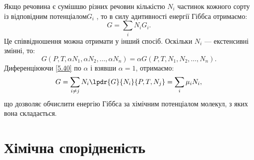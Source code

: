 Якщо речовина є сумішшю різних речовин кількістю $N_i$ частинок кожного сорту із відповідним потенціалом$ G_i$ , то в силу адитивності енергії Гіббса отримаємо:
\begin{equation}\label{5.39}
	G = \sum_{i}N_{i}G_{i}.
\end{equation}
Це співвідношення можна отримати у інший спосіб. Оскільки $N_{i}$ --- екстенсивні змінні, то:
\begin{equation}\label{5.40}
	G(P,T,\alpha N_{1}, \alpha N_{2}, \ldots, \alpha N_{n})= \alpha G(P,T,N_{1}, N_{2}, \ldots, N_{n}).
\end{equation}
Диференціюючи \eqref{5.40} по $\alpha$ і взявши $\alpha=1$, отримаємо:
\begin{equation}\label{5.41}
	G = \sum_{i\neq j}N_{i}\lpdr{G}{N_{i}}{P,T,N_{j}}=\sum_{i}\mu_{i}N_{i},
\end{equation}
що дозволяє обчислити енергію Гіббса за хімічним потенціалом молекул, з яких вона складається.

\section{Хімічна спорідненість}

